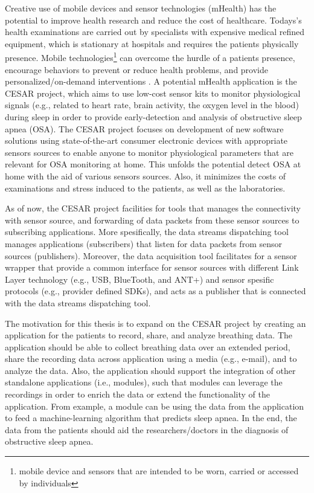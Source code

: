 Creative use of mobile devices and sensor technologies (mHealth) has the potential to improve health research and reduce the cost of healthcare. Todays's health examinations are carried out by specialists with expensive medical refined equipment, which is stationary at hospitals and requires the patients physically presence.  Mobile technologies\footnote{mobile device and sensors that are intended to be worn, carried or accessed by individuals} can overcome the hurdle of a patients presence, encourage behaviors to prevent or reduce health problems, and provide personalized/on-demand interventions \cite{kumar2013mobile}. A potential mHealth application is the CESAR project, which aims to use low-cost sensor kits to monitor physiological signals (e.g., related to heart rate, brain activity, the oxygen level in the blood) during sleep in order to provide early-detection and analysis of obstructive sleep apnea (OSA). The CESAR project \cite{cesar} focuses on development of new software solutions using state-of-the-art consumer electronic devices with appropriate sensors sources to enable anyone to monitor physiological parameters that are relevant for OSA monitoring at home. This unfolds the potential detect OSA at home with the aid of various sensors sources. Also, it minimizes the costs of examinations and stress induced to the patients, as well as the laboratories. 

As of now, the CESAR project facilities for tools that manages the connectivity with sensor source, and forwarding of data packets from these sensor sources to subscribing applications. More spesifically, the data streams dispatching tool \cite{daniel} manages applications (subscribers) that listen for data packets from sensor sources (publishers). Moreover, the data acquisition tool \cite{gjoby} facilitates for a sensor wrapper that provide a common interface for sensor sources with different Link Layer technology (e.g., USB, BlueTooth, and ANT+) and sensor spesific protocols (e.g., provider defined SDKs), and acts as a publisher that is connected with the data streams dispatching tool. 

The motivation for this thesis is to expand on the CESAR project by creating an application for the patients to record, share, and analyze breathing data. The application should be able to collect breathing data over an extended period, share the recording data across application using a media (e.g., e-mail), and to analyze the data. Also, the application should support the integration of other standalone applications (i.e., modules), such that modules can leverage the recordings in order to enrich the data or extend the functionality of the application. From example, a module can be using the data from the application to feed a machine-learning algorithm that predicts sleep apnea. In the end, the data from the patients should aid the researchers/doctors in the diagnosis of obstructive sleep apnea.  